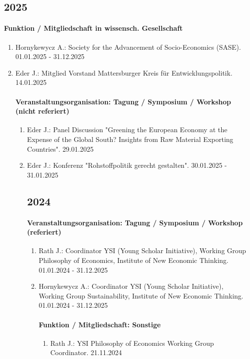\subsection{2025} 
\paragraph{Funktion / Mitgliedschaft in wissensch. Gesellschaft} 
\begin{enumerate}[leftmargin=*, labelsep=0.5cm] 
 	 \item Hornykewycz A.: Society for the Advancement of Socio-Economics (SASE). 01.01.2025 - 31.12.2025 
	 \item Eder J.: Mitglied Vorstand Mattersburger Kreis für Entwicklungspolitik. 14.01.2025 
\paragraph{Veranstaltungsorganisation: Tagung / Symposium / Workshop (nicht referiert)} 
\begin{enumerate}[leftmargin=*, labelsep=0.5cm] 
 	 \item Eder J.: Panel Discussion "Greening the European Economy at the Expense of the Global South? Insights from Raw Material Exporting Countries". 29.01.2025 
	 \item Eder J.: Konferenz "Rohstoffpolitik gerecht gestalten". 30.01.2025 - 31.01.2025 
\subsection{2024} 
\paragraph{Veranstaltungsorganisation: Tagung / Symposium / Workshop (referiert)} 
\begin{enumerate}[leftmargin=*, labelsep=0.5cm] 
 	 \item Rath J.: Coordinator YSI (Young Scholar Initiative), Working Group Philosophy of Economics,  Institute of New Economic Thinking. 01.01.2024 - 31.12.2025 
	 \item Hornykewycz A.: Coordinator YSI (Young Scholar Initiative), Working Group Sustainability, Institute of New Economic Thinking. 01.01.2024 - 31.12.2025 
\paragraph{Funktion / Mitgliedschaft: Sonstige} 
\begin{enumerate}[leftmargin=*, labelsep=0.5cm] 
 	 \item Rath J.: YSI Philosophy of Economics Working Group Coordinator. 21.11.2024 

\end{enumerate}
\end{enumerate}
\end{enumerate}
\end{enumerate}
